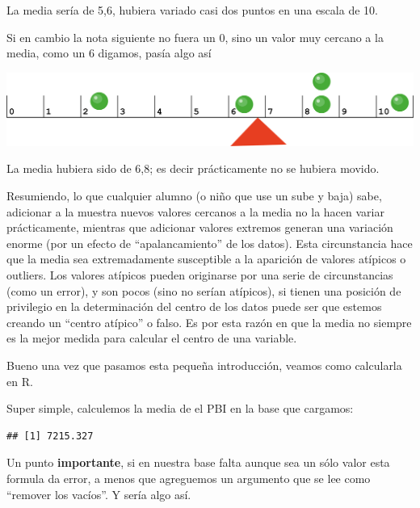 \documentclass[
]{book}
\newenvironment{Shaded}{\begin{snugshade}}{\end{snugshade}}
\newcommand{\AttributeTok}[1]{\textcolor[rgb]{0.77,0.63,0.00}{#1}}
\newcommand{\ConstantTok}[1]{\textcolor[rgb]{0.00,0.00,0.00}{#1}}
\newcommand{\FunctionTok}[1]{\textcolor[rgb]{0.00,0.00,0.00}{#1}}
\newcommand{\NormalTok}[1]{#1}
\newcommand{\SpecialCharTok}[1]{\textcolor[rgb]{0.00,0.00,0.00}{#1}}
\begin{document}
La media sería de 5,6, hubiera variado casi dos puntos en una escala de 10.

Si en cambio la nota siguiente no fuera un 0, sino un valor muy cercano a la media, como un 6 digamos, pasía algo así

\includegraphics[width=45.92in]{img/mean_ruler_3}

La media hubiera sido de 6,8; es decir prácticamente no se hubiera movido.

Resumiendo, lo que cualquier alumno (o niño que use un sube y baja) sabe, adicionar a la muestra nuevos valores cercanos a la media no la hacen variar prácticamente, mientras que adicionar valores extremos generan una variación enorme (por un efecto de ``apalancamiento'' de los datos). Esta circunstancia hace que la media sea extremadamente susceptible a la aparición de valores atípicos o outliers. Los valores atípicos pueden originarse por una serie de circunstancias (como un error), y son pocos (sino no serían atípicos), si tienen una posición de privilegio en la determinación del centro de los datos puede ser que estemos creando un ``centro atípico'' o falso. Es por esta razón en que la media no siempre es la mejor medida para calcular el centro de una variable.

Bueno una vez que pasamos esta pequeña introducción, veamos como calcularla en R.

Super simple, calculemos la media de el PBI en la base que cargamos:

\begin{Shaded}
\end{Shaded}

\begin{verbatim}
## [1] 7215.327
\end{verbatim}

Un punto \textbf{importante}, si en nuestra base falta aunque sea un sólo valor esta formula da error, a menos que agreguemos un argumento que se lee como ``remover los vacíos''. Y sería algo así.

\begin{Shaded}
\end{Shaded}
\end{document}
